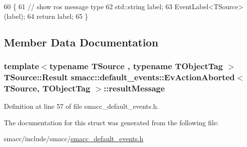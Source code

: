 \begin{DoxyCode}
60   \{
61     \textcolor{comment}{// show ros message type}
62     std::string label;
63     EventLabel<TSource>(label);
64     \textcolor{keywordflow}{return} label;
65   \}
\end{DoxyCode}


\subsection{Member Data Documentation}
\subsubsection[{\texorpdfstring{result\+Message}{resultMessage}}]{\setlength{\rightskip}{0pt plus 5cm}template$<$typename T\+Source , typename T\+Object\+Tag $>$ T\+Source\+::\+Result {\bf smacc\+::default\+\_\+events\+::\+Ev\+Action\+Aborted}$<$ T\+Source, T\+Object\+Tag $>$\+::result\+Message}\hypertarget{structsmacc_1_1default__events_1_1EvActionAborted_a0cd103e20d922ab5039022b67fffd5f7}{}\label{structsmacc_1_1default__events_1_1EvActionAborted_a0cd103e20d922ab5039022b67fffd5f7}


Definition at line 57 of file smacc\+\_\+default\+\_\+events.\+h.



The documentation for this struct was generated from the following file\+:\begin{DoxyCompactItemize}
\item 
smacc/include/smacc/\hyperlink{smacc__default__events_8h}{smacc\+\_\+default\+\_\+events.\+h}\end{DoxyCompactItemize}

